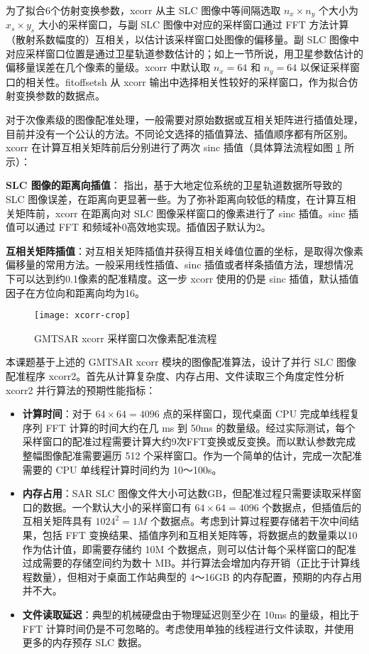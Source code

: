 为了拟合6个仿射变换参数，xcorr 从主 SLC 图像中等间隔选取 $n_x \times n_y $ 个大小为 $x_s \times y_s$ 大小的采样窗口，与副 SLC 图像中对应的采样窗口通过 FFT 方法计算（散射系数幅度的）互相关，以估计该采样窗口处图像的偏移量。副 SLC 图像中对应采样窗口位置是通过卫星轨道参数估计的；如上一节所说，用卫星参数估计的偏移量误差在几个像素的量级。xcorr 中默认取 $n_x=64$ 和 $n_y=64$ 以保证采样窗口的相关性。fitoffsetsh 从 xcorr 输出中选择相关性较好的采样窗口，作为拟合仿射变换参数的数据点。

对于次像素级的图像配准处理，一般需要对原始数据或互相关矩阵进行插值处理，目前并没有一个公认的方法。不同论文选择的插值算法、插值顺序都有所区别\cite{li2008image}\cite{hanssen1999evaluation}。xcorr 在计算互相关矩阵前后分别进行了两次 sinc 插值（具体算法流程如图 \ref{fig:xcorr} 所示）：

\textbf{SLC 图像的距离向插值}：\citet{sandwell2011gmtsar} 指出，基于大地定位系统的卫星轨道数据所导致的 SLC 图像误差，在距离向更显著一些。为了弥补距离向较低的精度，在计算互相关矩阵前，xcorr 在距离向对 SLC 图像采样窗口的像素进行了 sinc 插值。sinc 插值可以通过 FFT 和频域补0高效地实现。插值因子默认为2。

\textbf{互相关矩阵插值}：对互相关矩阵插值并获得互相关峰值位置的坐标，是取得次像素偏移量的常用方法。一般采用线性插值、sinc 插值或者样条插值方法，理想情况下可以达到约0.1像素的配准精度\cite{li2008image}。这一步 xcorr 使用的仍是 sinc 插值，默认插值因子在方位向和距离向均为16。

\begin{figure}[ht]
\centering
\texttt{[image: xcorr-crop]}
\caption{GMTSAR xcorr 采样窗口次像素配准流程} \label{fig:xcorr}
\end{figure}

本课题基于上述的 GMTSAR xcorr 模块的图像配准算法，设计了并行 SLC 图像配准程序 xcorr2。首先从计算复杂度、内存占用、文件读取三个角度定性分析 xcorr2 并行算法的预期性能指标：

\begin{itemize}
    \item \textbf{计算时间}：对于 $64 \times 64 = 4096$ 点的采样窗口，现代桌面 CPU 完成单线程复序列 FFT 计算的时间大约在几 ms 到 50ms 的数量级\cite{fftwbench}。经过实际测试，每个采样窗口的配准过程需要计算大约9次FFT变换或反变换。而以默认参数完成整幅图像配准需要遍历 512 个采样窗口。作为一个简单的估计，完成一次配准需要的 CPU 单线程计算时间约为 10～100s。
    \item \textbf{内存占用}：SAR SLC 图像文件大小可达数GB，但配准过程只需要读取采样窗口的数据。一个默认大小的采样窗口有 $64 \times 64 = 4096$ 个数据点，但插值后的互相关矩阵具有 $1024^2 = 1M$ 个数据点。考虑到计算过程要存储若干次中间结果，包括 FFT 变换结果、插值序列和互相关矩阵等，将数据点的数量乘以10作为估计值，即需要存储约 10M 个数据点，则可以估计每个采样窗口的配准过成需要的存储空间约为数十 MB。并行算法会增加内存开销（正比于计算线程数量），但相对于桌面工作站典型的 4～16GB 的内存配置，预期的内存占用并不大。
    \item \textbf{文件读取延迟}：典型的机械硬盘由于物理延迟则至少在 10ms 的量级\cite{wiki:hddcharacter}，相比于 FFT 计算时间仍是不可忽略的。考虑使用单独的线程进行文件读取，并使用更多的内存预存 SLC 数据。
\end{itemize}

